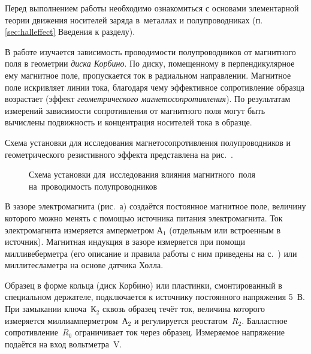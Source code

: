 


Перед выполнением работы необходимо ознакомиться с основами
элементарной теории движения носителей заряда в~металлах и полупроводниках
(п. \ref{sec:halleffect} Введения к разделу).

В работе изучается зависимость проводимости полупроводников от магнитного поля
в геометрии \emph{диска Корбино}.
По диску, помещенному в перпендикулярное ему магнитное поле, пропускается
ток в радиальном направлении. Магнитное поле искривляет линии 
тока, благодаря чему эффективное сопротивление образца возрастает
(эффект \emph{геометрического магнетосопротивления}). По результатам
измерений зависимости сопротивления от магнитного поля 
могут быть вычислены подвижность и концентрация носителей тока в образце.

\experiment
Схема установки для исследования магнетосопротивления
полупроводников и геометрического резистивного эффекта представлена на
рис.~.

\begin{figure}[h!]
    \centering
    \caption{Схема установки для~исследования влияния магнитного~поля
        на~проводимость полупроводников}
\end{figure}

В зазоре электромагнита (рис.~а) создаётся постоянное магнитное
поле, величину которого можно менять с помощью источника питания электромагнита.
Ток электромагнита измеряется амперметром А$_1$ (отдельным или встроенным в источник).
Магнитная индукция в зазоре измеряется при помощи милливеберметра (его описание
и правила работы с ним приведены на с.~\pageref{MWB}) или 
миллитесламетра на основе датчика Холла.

Образец в форме кольца (диск Корбино) или пластинки, смонтированный в
специальном держателе, подключается к источнику постоянного напряжения 5~В. При
замыкании ключа~К$_2$ сквозь образец течёт ток, величина которого измеряется
миллиамперметром~А$_2$ и регулируется реостатом~$R_2$. Балластное сопротивление~$R_0$
ограничивает ток через образец. Измеряемое напряжение подаётся на вход
вольтметра~V.

